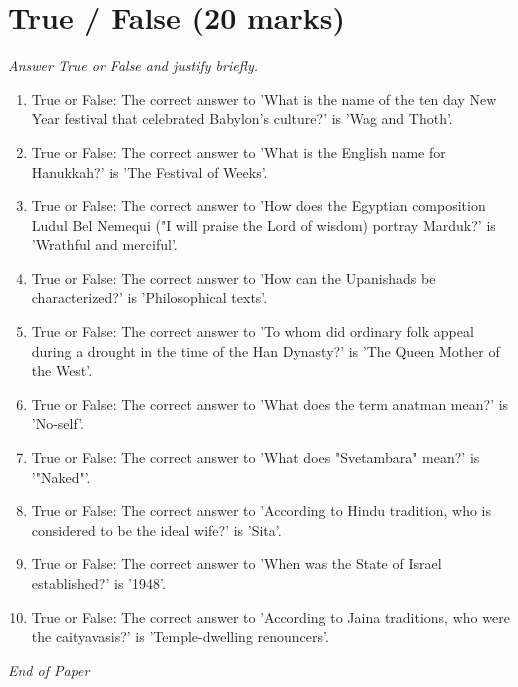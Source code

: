 \documentclass[12pt]{article}
\begin{document}
\section*{True / False (20 marks)}
\textit{Answer True or False and justify briefly.}
\begin{enumerate}[label=\arabic*.]
\item True or False: The correct answer to 'What is the name of the ten day New Year festival that celebrated Babylon's culture?' is 'Wag and Thoth'.
\item True or False: The correct answer to 'What is the English name for Hanukkah?' is 'The Festival of Weeks'.
\item True or False: The correct answer to 'How does the Egyptian composition Ludul Bel Nemequi ("I will praise the Lord of wisdom) portray Marduk?' is 'Wrathful and merciful'.
\item True or False: The correct answer to 'How can the Upanishads be characterized?' is 'Philosophical texts'.
\item True or False: The correct answer to 'To whom did ordinary folk appeal during a drought in the time of the Han Dynasty?' is 'The Queen Mother of the West'.
\item True or False: The correct answer to 'What does the term anatman mean?' is 'No-self'.
\item True or False: The correct answer to 'What does "Svetambara" mean?' is '"Naked"'.
\item True or False: The correct answer to 'According to Hindu tradition, who is considered to be the ideal wife?' is 'Sita'.
\item True or False: The correct answer to 'When was the State of Israel established?' is '1948'.
\item True or False: The correct answer to 'According to Jaina traditions, who were the caityavasis?' is 'Temple-dwelling renouncers'.
\end{enumerate}

\vfill
\noindent\textit{End of Paper}
\end{document}
